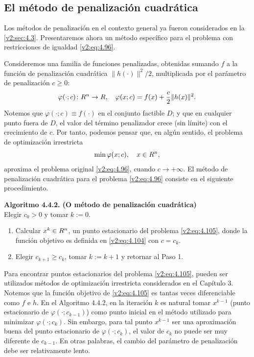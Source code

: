 
\subsection{El método de penalización cuadrática}\label{v2:sec:4.4.2}

Los métodos de penalización en el contexto general ya fueron considerados en la \cref{v2:sec:4.3}. Presentaremos ahora un método específico para el problema con restricciones de igualdad \eqref{v2:eq:4.96}.

Consideremos una familia de funciones penalizadas, obtenidas sumando $f$ a la función de penalización cuadrática $\|h(\cdot)\|^2/2$, multiplicada por el parámetro de penalización $c \ge 0$:
\begin{equation}
    \varphi(\cdot; c) \colon R^n \to R, \quad \varphi(x; c) = f(x) + \frac{c}{2}\|h(x)\|^2.
    \label{v2:eq:4.104}
\end{equation}
Notemos que $\varphi(\cdot; c) \equiv f(\cdot)$ en el conjunto factible $D$; y que en cualquier punto fuera de $D$, el valor del término penalizador crece (sin límite) con el crecimiento de $c$. Por tanto, podemos pensar que, en algún sentido, el problema de optimización irrestricta
\begin{equation}
    \min \varphi(x; c), \quad x \in R^n,
    \label{v2:eq:4.105}
\end{equation}
aproxima el problema original \eqref{v2:eq:4.96}, cuando $c \to +\infty$. El método de penalización cuadrática para el problema \eqref{v2:eq:4.96} consiste en el siguiente procedimiento.

\noindent \textbf{Algoritmo 4.4.2. (O método de penalización cuadrática)} \\
Elegir $c_0 > 0$ y tomar $k := 0$.
\begin{enumerate}
    \item Calcular $x^k \in R^n$, un punto estacionario del problema \eqref{v2:eq:4.105}, donde la función objetivo es definida en \eqref{v2:eq:4.104} con $c = c_k$.
    \item Elegir $c_{k+1} \ge c_k$, tomar $k := k + 1$ y retornar al Paso 1.
\end{enumerate}

Para encontrar puntos estacionarios del problema \eqref{v2:eq:4.105}, pueden ser utilizados métodos de optimización irrestricta considerados en el Capítulo 3. Notemos que la función objetivo de \eqref{v2:eq:4.105} es tantas veces diferenciable como $f$ e $h$. En el Algoritmo 4.4.2, en la iteración $k$ es natural tomar $x^{k-1}$ (punto estacionario de $\varphi(\cdot; c_{k-1})$) como punto inicial en el método utilizado para minimizar $\varphi(\cdot; c_k)$. Sin embargo, para tal punto $x^{k-1}$ ser una aproximación buena del punto estacionario de $\varphi(\cdot; c_k)$, el valor de $c_k$ no puede ser muy diferente de $c_{k-1}$. En otras palabras, el cambio del parámetro de penalización debe ser relativamente lento.

